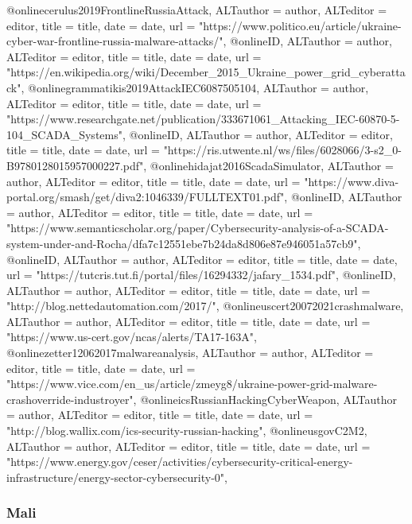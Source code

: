 {{{{{{{{{{{{{{@online{cerulus2019FrontlineRussiaAttack,	ALTauthor = {author},	ALTeditor = {editor},	title = {title},	date = {date},	url = {"https://www.politico.eu/article/ukraine-cyber-war-frontline-russia-malware-attacks/"},}
@online{ID,	ALTauthor = {author},	ALTeditor = {editor},	title = {title},	date = {date},	url = {"https://en.wikipedia.org/wiki/December_2015_Ukraine_power_grid_cyberattack"},}
@online{grammatikis2019AttackIEC6087505104,	ALTauthor = {author},	ALTeditor = {editor},	title = {title},	date = {date},	url = {"https://www.researchgate.net/publication/333671061_Attacking_IEC-60870-5-104_SCADA_Systems"},}
@online{ID,	ALTauthor = {author},	ALTeditor = {editor},	title = {title},	date = {date},	url = {"https://ris.utwente.nl/ws/files/6028066/3-s2_0-B9780128015957000227.pdf"},}
@online{hidajat2016ScadaSimulator,	ALTauthor = {author},	ALTeditor = {editor},	title = {title},	date = {date},	url = {"https://www.diva-portal.org/smash/get/diva2:1046339/FULLTEXT01.pdf"},}
@online{ID,	ALTauthor = {author},	ALTeditor = {editor},	title = {title},	date = {date},	url = {"https://www.semanticscholar.org/paper/Cybersecurity-analysis-of-a-SCADA-system-under-and-Rocha/dfa7c12551ebe7b24da8d806e87e946051a57cb9"},}
@online{ID,	ALTauthor = {author},	ALTeditor = {editor},	title = {title},	date = {date},	url = {"https://tutcris.tut.fi/portal/files/16294332/jafary_1534.pdf"},}
@online{ID,	ALTauthor = {author},	ALTeditor = {editor},	title = {title},	date = {date},	url = {"http://blog.nettedautomation.com/2017/"},}
@online{uscert20072021crashmalware,	ALTauthor = {author},	ALTeditor = {editor},	title = {title},	date = {date},	url = {"https://www.us-cert.gov/ncas/alerts/TA17-163A"},}
@online{zetter12062017malwareanalysis,	ALTauthor = {author},	ALTeditor = {editor},	title = {title},	date = {date},	url = {"https://www.vice.com/en_us/article/zmeyg8/ukraine-power-grid-malware-crashoverride-industroyer"},}
@online{icsRussianHackingCyberWeapon,	ALTauthor = {author},	ALTeditor = {editor},	title = {title},	date = {date},	url = {"http://blog.wallix.com/ics-security-russian-hacking"},}
@online{usgovC2M2,	ALTauthor = {author},	ALTeditor = {editor},	title = {title},	date = {date},	url = {"https://www.energy.gov/ceser/activities/cybersecurity-critical-energy-infrastructure/energy-sector-cybersecurity-0"},}



\subsubsection{Mali}

}}}}}}}}}}}}}}
